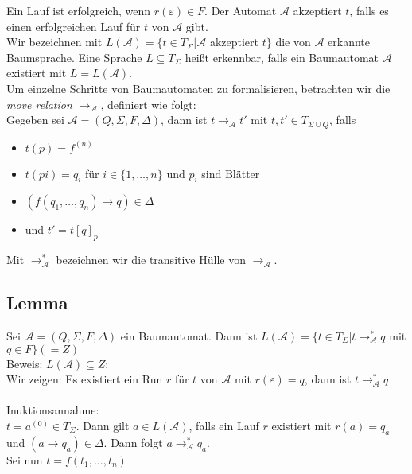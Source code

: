 \documentclass[titlepage]{article}
\begin{document}
Ein Lauf ist erfolgreich, wenn $r(\varepsilon) \in F$. Der Automat $\mathcal{A}$ akzeptiert $t$, falls es einen erfolgreichen Lauf
f\"ur $t$ von $\mathcal{A}$ gibt.\\
Wir bezeichnen mit $L(\mathcal{A}) = \{t \in T_{\Sigma} | \mathcal{A}$ akzeptiert $t\}$ die von $\mathcal{A}$ erkannte Baumsprache. Eine Sprache $L \subseteq T_{\Sigma}$ hei\ss t erkennbar, falls ein Baumautomat $\mathcal{A}$ existiert mit $L=L(\mathcal{A})$.\\

Um einzelne Schritte von Baumautomaten zu formalisieren, betrachten wir die \textit{move relation} $\rightarrow_{\mathcal{A}}$, 
definiert wie folgt:\\
Gegeben sei $\mathcal{A} = (Q, \Sigma, F, \Delta)$, dann ist $t \rightarrow _{\mathcal{A}} t'$ mit $t, t' \in T_{\Sigma \cup Q}$, falls

\begin{itemize}
	\item $t(p) = f^{(n)}$
	\item $t(pi) = q_i$ f\"ur $i \in \{1, \dots, n\}$ und $p_i$ sind Bl\"atter
	\item $(f(q_1, \dots, q_n) \rightarrow q) \in \Delta$
	\item und $t' = t[q]_p$
\end{itemize}

Mit $\rightarrow^\ast_{\mathcal{A}}$ bezeichnen wir die transitive H\"ulle von $\rightarrow_{\mathcal{A}}$.

\subsection{Lemma}

Sei $\mathcal{A} = (Q, \Sigma, F, \Delta)$ ein Baumautomat. Dann ist 
$L(\mathcal{A}) = \{t \in T_{\Sigma} | t \rightarrow^\ast_{\mathcal{A}} q$ mit $q \in F\} (=Z)$\\

Beweis: \glqq$L(\mathcal{A}) \subseteq Z$\grqq:\\

Wir zeigen: Es existiert ein Run $r$ f\"ur $t$ von $\mathcal{A}$ mit $r(\varepsilon) = q$, dann ist $t \rightarrow ^\ast_{\mathcal{A}} q$\\ \\
Inuktionsannahme:\\
$t=a^{(0)} \in T_{\Sigma}$. Dann gilt $a \in L({\mathcal{A}})$, falls ein Lauf $r$ existiert mit $r(a) = q_a$ und $(a \rightarrow q_a) \in \Delta$. Dann folgt $a \rightarrow^\ast_{{\mathcal{A}}} q_a$.\\
Sei nun $t=f(t_1, \dots, t_n)$\\ \\
\end{document}
